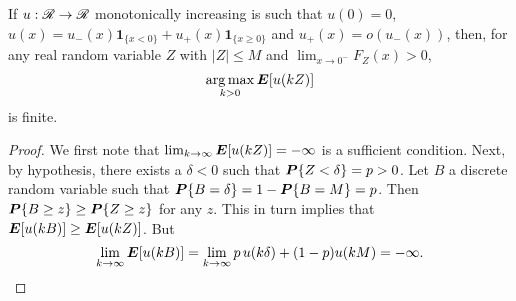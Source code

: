 \begin{claim}
  \label{claim_finite}
  If $u:\mathscr{R}\to\mathscr{R}$ monotonically increasing is such that $u(0) = 0$,
  $u(x) = u_-(x)\bm1_{\{x<0\}}+u_+(x)\bm 1_{\{x\geq 0\}}$ and $u_+(x) = o(u_-(x))$, then,
  for any real random variable $Z$ with $|Z|\leq M$ and $\lim_{x\to0^-}F_Z(x)>0$,
  \begin{equation*}
    \operatorname*{arg\,max}_{k>0} \bm E[u(kZ)]
  \end{equation*}
  is finite.
\end{claim}
\begin{proof}
  We first note that $\lim_{k\to\infty} \bm E[u(kZ)]=-\infty$ is a sufficient condition. Next,
  by hypothesis, there exists a $\delta<0$ such that $\bm P\{Z<\delta\}=p>0$. Let $B$ a
  discrete random variable such that $\bm P\{B=\delta\}=1-\bm P\{B=M\}=p$. Then $\bm P\{B\geq
  z\}\geq\bm P\{Z\geq z\}$ for any $z$. This in turn implies that
  $\bm E[u(kB)]\geq\bm E[u(kZ)]$. But 
  \begin{equation*}
    \lim_{k\to\infty}\bm E[u(kB)] = \lim_{k\to\infty}p\,u(k\delta)+(1-p)u(kM) = -\infty.\qedhere
  \end{equation*}
\end{proof}

